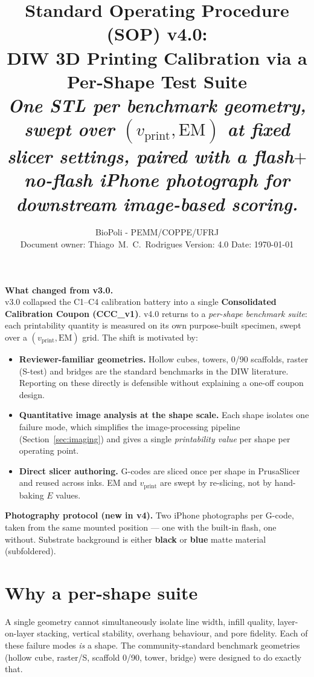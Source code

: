 \documentclass[11pt,a4paper]{article}
\title{\textbf{Standard Operating Procedure (SOP) v4.0:\\
DIW 3D Printing Calibration via a Per-Shape Test Suite}\\[4pt]
\large \textsl{One STL per benchmark geometry, swept over
$(v_\mathrm{print}, \mathrm{EM})$ at fixed slicer settings, paired
with a flash$+$no-flash iPhone photograph for downstream
image-based scoring.}}
\author{BioPoli - PEMM/COPPE/UFRJ \\[2pt]
\small Document owner: Thiago~M.~C.~Rodrigues \quad
Version: 4.0 \quad Date: \today}
\date{}
\begin{document}
\maketitle
\thispagestyle{fancy}

\begin{tcolorbox}[colback=blue!3!white,colframe=blue!50!black,
                  arc=2mm,boxrule=0.4pt,left=8pt,right=8pt]
\textbf{What changed from v3.0.}\\
v3.0 collapsed the C1--C4 calibration battery into a single
\textbf{Consolidated Calibration Coupon (CCC\_v1)}. v4.0 returns to
a \emph{per-shape benchmark suite}: each printability quantity is
measured on its own purpose-built specimen, swept over a
$(v_\mathrm{print}, \mathrm{EM})$ grid. The shift is motivated by:
\begin{itemize}[leftmargin=1.4em,itemsep=1pt]
\item \textbf{Reviewer-familiar geometries.} Hollow cubes, towers,
0/90 scaffolds, raster (S-test) and bridges are the standard
benchmarks in the DIW literature. Reporting on these directly is
defensible without explaining a one-off coupon design.
\item \textbf{Quantitative image analysis at the shape scale.}
Each shape isolates one failure mode, which simplifies the
image-processing pipeline (Section~\ref{sec:imaging}) and gives a
single \emph{printability value} per shape per operating point.
\item \textbf{Direct slicer authoring.} G-codes are sliced
once per shape in PrusaSlicer and reused across inks. EM and
$v_\mathrm{print}$ are swept by re-slicing, not by hand-baking $E$
values.
\end{itemize}

\textbf{Photography protocol (new in v4).} Two iPhone photographs
per G-code, taken from the same mounted position --- one with the
built-in flash, one without. Substrate background is either
\textbf{black} or \textbf{blue} matte material (subfoldered).
\end{tcolorbox}

\tableofcontents
\bigskip

\section{Why a per-shape suite}

\begin{keybox}
A single geometry cannot simultaneously isolate line width,
infill quality, layer-on-layer stacking, vertical stability,
overhang behaviour, and pore fidelity. Each of these failure
modes \emph{is} a shape. The community-standard benchmark
geometries (hollow cube, raster/S, scaffold 0/90, tower, bridge)
were designed to do exactly that.
\end{keybox}
\end{document}

